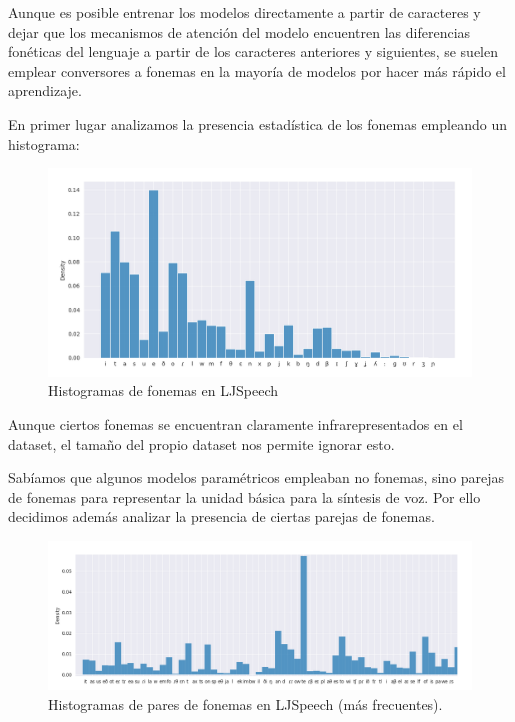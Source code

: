Aunque es posible entrenar los modelos directamente a partir de caracteres y dejar que los mecanismos de atención del modelo encuentren las diferencias fonéticas del lenguaje a partir de los caracteres anteriores y siguientes, se suelen emplear conversores a fonemas en la mayoría de modelos por hacer más rápido el aprendizaje.

En primer lugar analizamos la presencia estadística de los fonemas empleando un histograma:

\begin{figure}[H]
\centering
\includegraphics[width=14cm]{Z_anexos_img/ljs-1.png}
\caption{Histogramas de fonemas en LJSpeech}
\label{fig:figure1}
\end{figure}

Aunque ciertos fonemas se encuentran claramente infrarepresentados en el dataset, el tamaño del propio dataset nos permite ignorar esto. 

Sabíamos que algunos modelos paramétricos empleaban no fonemas, sino parejas de fonemas para representar la unidad básica para la síntesis de voz. Por ello decidimos además analizar la presencia de ciertas parejas de fonemas.

\begin{figure}[H]
\centering
\includegraphics[width=14cm]{Z_anexos_img/ljs-2.png}
\caption{Histogramas de pares de fonemas en LJSpeech (más frecuentes).}
\label{fig:figure1}
\end{figure}


